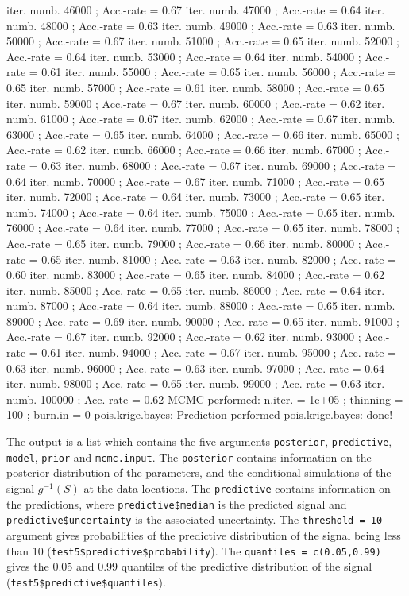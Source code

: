\documentclass[12pt,a4paper]{article}
\newcommand{\code}[1]{\texttt{\small #1}}
\begin{document}
\begin{Schunk}
\begin{Soutput}
iter. numb. 46000 ; Acc.-rate = 0.67 
iter. numb. 47000 ; Acc.-rate = 0.64 
iter. numb. 48000 ; Acc.-rate = 0.63 
iter. numb. 49000 ; Acc.-rate = 0.63 
iter. numb. 50000 ; Acc.-rate = 0.67 
iter. numb. 51000 ; Acc.-rate = 0.65 
iter. numb. 52000 ; Acc.-rate = 0.64 
iter. numb. 53000 ; Acc.-rate = 0.64 
iter. numb. 54000 ; Acc.-rate = 0.61 
iter. numb. 55000 ; Acc.-rate = 0.65 
iter. numb. 56000 ; Acc.-rate = 0.65 
iter. numb. 57000 ; Acc.-rate = 0.61 
iter. numb. 58000 ; Acc.-rate = 0.65 
iter. numb. 59000 ; Acc.-rate = 0.67 
iter. numb. 60000 ; Acc.-rate = 0.62 
iter. numb. 61000 ; Acc.-rate = 0.67 
iter. numb. 62000 ; Acc.-rate = 0.67 
iter. numb. 63000 ; Acc.-rate = 0.65 
iter. numb. 64000 ; Acc.-rate = 0.66 
iter. numb. 65000 ; Acc.-rate = 0.62 
iter. numb. 66000 ; Acc.-rate = 0.66 
iter. numb. 67000 ; Acc.-rate = 0.63 
iter. numb. 68000 ; Acc.-rate = 0.67 
iter. numb. 69000 ; Acc.-rate = 0.64 
iter. numb. 70000 ; Acc.-rate = 0.67 
iter. numb. 71000 ; Acc.-rate = 0.65 
iter. numb. 72000 ; Acc.-rate = 0.64 
iter. numb. 73000 ; Acc.-rate = 0.65 
iter. numb. 74000 ; Acc.-rate = 0.64 
iter. numb. 75000 ; Acc.-rate = 0.65 
iter. numb. 76000 ; Acc.-rate = 0.64 
iter. numb. 77000 ; Acc.-rate = 0.65 
iter. numb. 78000 ; Acc.-rate = 0.65 
iter. numb. 79000 ; Acc.-rate = 0.66 
iter. numb. 80000 ; Acc.-rate = 0.65 
iter. numb. 81000 ; Acc.-rate = 0.63 
iter. numb. 82000 ; Acc.-rate = 0.60 
iter. numb. 83000 ; Acc.-rate = 0.65 
iter. numb. 84000 ; Acc.-rate = 0.62 
iter. numb. 85000 ; Acc.-rate = 0.65 
iter. numb. 86000 ; Acc.-rate = 0.64 
iter. numb. 87000 ; Acc.-rate = 0.64 
iter. numb. 88000 ; Acc.-rate = 0.65 
iter. numb. 89000 ; Acc.-rate = 0.69 
iter. numb. 90000 ; Acc.-rate = 0.65 
iter. numb. 91000 ; Acc.-rate = 0.67 
iter. numb. 92000 ; Acc.-rate = 0.62 
iter. numb. 93000 ; Acc.-rate = 0.61 
iter. numb. 94000 ; Acc.-rate = 0.67 
iter. numb. 95000 ; Acc.-rate = 0.63 
iter. numb. 96000 ; Acc.-rate = 0.63 
iter. numb. 97000 ; Acc.-rate = 0.64 
iter. numb. 98000 ; Acc.-rate = 0.65 
iter. numb. 99000 ; Acc.-rate = 0.63 
iter. numb. 100000 ; Acc.-rate = 0.62 
MCMC performed: n.iter. =  1e+05 ; thinning =  100 ; burn.in =  0 
pois.krige.bayes: Prediction performed 
pois.krige.bayes: done!
\end{Soutput}
\end{Schunk}

The output is a list which contains the five arguments \code{posterior}, \code{predictive}, \code{model}, \code{prior} and \code{mcmc.input}. 
The \code{posterior} contains information
on the posterior distribution of the parameters, and the conditional simulations of the signal 
$g^{-1}(S)$ at the data locations. 
The \code{predictive} contains information on the predictions, where 
\code{predictive\$median} is the predicted signal and \code{predictive\$uncertainty} is the associated uncertainty.
The \code{threshold = 10} argument gives probabilities of the predictive distribution of the signal being less 
than 10 (\code{test5\$predictive\$probability}).
The \code{quantiles = c(0.05,0.99)} gives the 0.05 and 0.99 quantiles of the predictive distribution of the signal 
(\code{test5\$predictive\$quantiles}).
\end{document}
